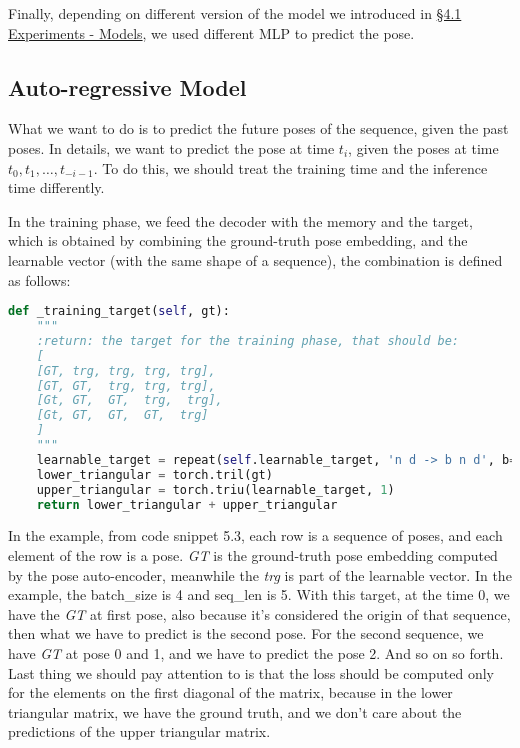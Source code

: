 Finally, depending on different version of the model we introduced in \hyperref[subsec:models]{\S4.1 Experiments - Models}, we used different MLP to predict the pose.

\subsection{Auto-regressive Model}\label{subsec:auto-regressive-model}
What we want to do is to predict the future poses of the sequence, given the past poses.
In details, we want to predict the pose at time $t_i$, given the poses at time $t_0, t_1, \dots, t_{-i-1}$.
To do this, we should treat the training time and the inference time differently.

In the training phase, we feed the decoder with the memory and the target, which is obtained by combining the ground-truth pose embedding, and the learnable vector (with the same shape of a sequence), the combination is defined as follows:
\begin{lstlisting}[captionpos=b, label={lst:lst-training-target}, caption={Training target}, language=Python]
def _training_target(self, gt):
    """
    :return: the target for the training phase, that should be:
    [
    [GT, trg, trg, trg, trg],
    [GT, GT,  trg, trg, trg],
    [Gt, GT,  GT,  trg,  trg],
    [Gt, GT,  GT,  GT,  trg]
    ]
    """
    learnable_target = repeat(self.learnable_target, 'n d -> b n d', b=gt.shape[0])
    lower_triangular = torch.tril(gt)
    upper_triangular = torch.triu(learnable_target, 1)
    return lower_triangular + upper_triangular
\end{lstlisting}
In the example, from code snippet 5.3, each row is a sequence of poses, and each element of the row is a pose.
\textit{GT} is the ground-truth pose embedding computed by the pose auto-encoder, meanwhile the \textit{trg} is part of the learnable vector.
In the example, the batch\_size is 4 and seq\_len is 5.
With this target, at the time 0, we have the \textit{GT} at first pose, also because it's considered the origin of that sequence, then what we have to predict is the second pose.
For the second sequence, we have \textit{GT} at pose 0 and 1, and we have to predict the pose 2.
And so on so forth.
Last thing we should pay attention to is that the loss should be computed only for the elements on the first diagonal of the matrix, because in the lower triangular matrix, we have the ground truth, and we don't care about the predictions of the upper triangular matrix.

